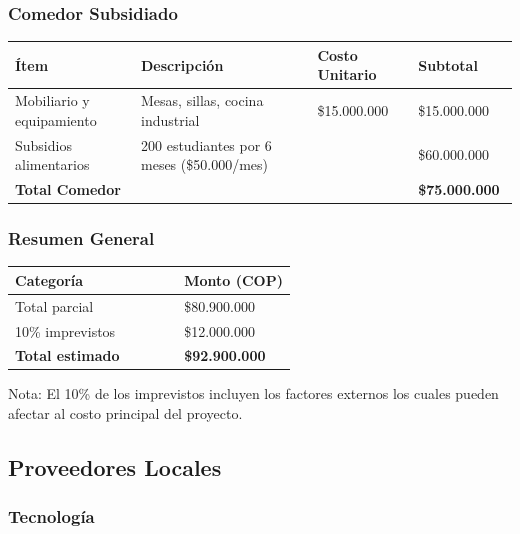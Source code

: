 \documentclass[letterpaper, 11pt]{report}
\begin{document}
\subsubsection{Comedor Subsidiado}

\begin{longtable}{|p{0.25\linewidth}|p{0.35\linewidth}|p{0.20\linewidth}|p{0.20\linewidth}|}
      \hline
      \textbf{Ítem}             & \textbf{Descripción}                       & \textbf{Costo Unitario} & \textbf{Subtotal}     \\
      \hline
      Mobiliario y equipamiento & Mesas, sillas, cocina industrial           & \$15.000.000            & \$15.000.000          \\
      \hline
      Subsidios alimentarios    & 200 estudiantes por 6 meses (\$50.000/mes) &                         & \$60.000.000          \\
      \hline
      \textbf{Total Comedor}    &                                            &                         & \textbf{\$75.000.000} \\
      \hline
\end{longtable}

\subsubsection{Resumen General}
\begin{longtable}{|p{0.6\linewidth}|p{0.4\linewidth}|}
      \hline
      \textbf{Categoría}      & \textbf{Monto (COP)}  \\
      \hline
      Total parcial           & \$80.900.000          \\
      \hline
      10\% imprevistos        & \$12.000.000          \\
      \hline
      \textbf{Total estimado} & \textbf{\$92.900.000} \\
      \hline
\end{longtable}

Nota: El 10\% de los imprevistos incluyen los factores externos los cuales
pueden afectar al costo principal del proyecto.

\subsection{Proveedores Locales}

\subsubsection{Tecnología}
\end{document}
